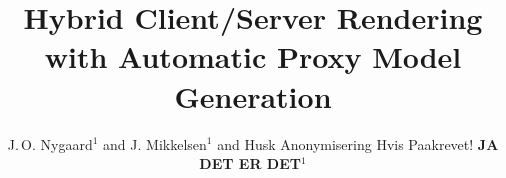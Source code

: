 


\title[Automatic Proxy Model Generation]%
      {Hybrid Client/Server Rendering with Automatic Proxy Model Generation}

\author[J.\,O. Nygaard \& J. Mikkelsen]
       {J.\,O. Nygaard$^{1}$
        and J. Mikkelsen$^{1}$
        and Husk Anonymisering Hvis Paakrevet! \textbf{JA DET ER DET}$^{1}$
        \\
       }


%




